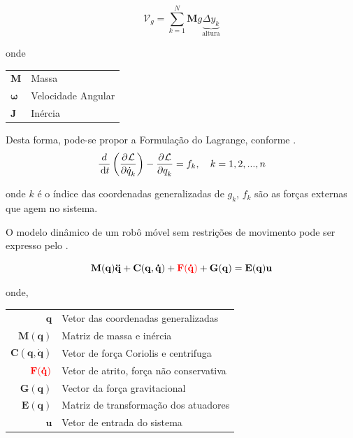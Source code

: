 \begin{equation}
  \mathcal{V}_g = \sum\limits_{k=1}^{N}\mathbf{M}g \underbrace{\Delta y_k}_{\text{altura}}
  \label{eq:lag3}
\end{equation}  

\noindent onde

\begin{center}
   \begin{tabular}{l|l}
       $\mathbf{M}$               & Massa     \\
       $\mathbf{\omega}$ & Velocidade Angular \\
       $\mathbf{J}$               & Inércia   \\
   \end{tabular}
\end{center}

Desta forma, pode-se propor a Formulação do Lagrange, conforme .
\begin{equation}
   \frac{d}{\df{t}}\left( \parcial{}{\mathcal{L}}{\dot{q}_k}\right)
   -\parcial{}{\mathcal{L}}{q_k}
   = f_k, \quad k = 1,2,...,n
   \label{eq:lag4}
\end{equation}

\noindent onde $k$ é o índice das coordenadas generalizadas de $g_k$, $f_k$ são as forças externas que agem no sistema.

O modelo dinâmico de um robô móvel sem restrições de movimento pode ser expresso pelo .

\begin{equation}
   \mathbf{M(q)\ddot{q}+ C(q, \dot{q})+ \textcolor{red}{F(\dot{q})}+G(q) = E(q)u}
   \label{eq:lag5}
\end{equation}

\noindent onde, 

\begin{center}
   \begin{tabular}{ r | l }
     $\mathbf{q}$               & Vetor das coordenadas generalizadas    \\
     $\mathbf{M(q)}$            & Matriz de massa e inércia              \\
     $\mathbf{C(q, \dot{q})}$   & Vetor de força Coriolis e centrifuga   \\
     $\color{red}{\mathbf{F(\dot{q})}}$      & Vetor de atrito, força não conservativa\\
     $\mathbf{G(q)}$            & Vector da força gravitacional          \\
     $\mathbf{E(q)}$            & Matriz de transformação dos atuadores \\
     $\mathbf{u}$               & Vetor de entrada do sistema            \\
   \end{tabular}
\end{center}

